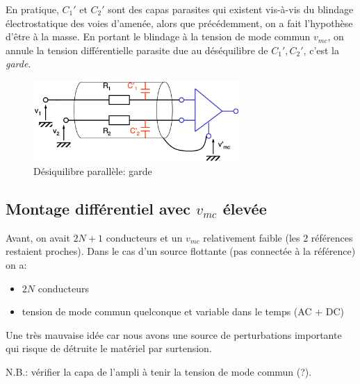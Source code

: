En pratique, \(C_1'\text{ et }C_2'\) sont des capas parasites qui existent vis-à-vis du blindage électrostatique des voies d'amenée, alors que précédemment, on a fait l'hypothèse d'être à la masse. En portant le blindage à la tension de mode commun \(v_{mc}\), on annule la tension différentielle parasite due au déséquilibre de \(C_1', C_2'\), c'est la \emph{garde}.
\begin{figure}[H] 
	\centering 
	\includegraphics[width=0.7\textwidth,height=10\baselineskip,keepaspectratio]{ch3/image20} 
	\caption{Désiquilibre parallèle: garde} 
\end{figure}
\subsection{Montage différentiel avec \texorpdfstring{\(v_{mc}\)}{tension de mode commun} élevée}\label{subsec:montdiffvmcgrand}
Avant, on avait \(2N+1\) conducteurs et un \(v_{mc}\) relativement faible (les 2 références restaient proches). Dans le cas d'un source flottante (pas connectée à la référence) on a:
\begin{itemize}
	\item \(2N\) conducteurs
	\item tension de mode commun quelconque et variable dans le temps (AC + DC)
\end{itemize}
Une très mauvaise idée car nous avons une source de perturbations importante qui risque de détruite le matériel par surtension.

N.B.: vérifier la capa de l'ampli à tenir la tension de mode commun (\!?).
